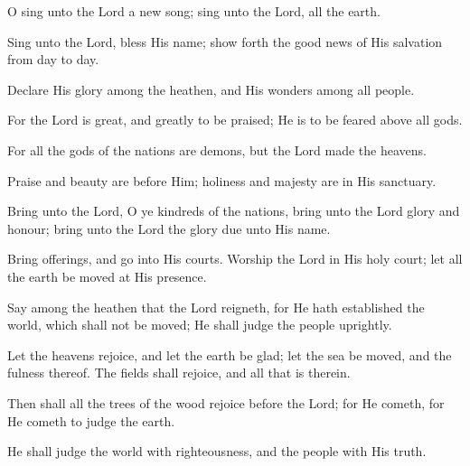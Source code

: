 O sing unto the Lord a new song; sing unto the Lord, all the earth.

Sing unto the Lord, bless His name; show forth the good news of His salvation from day to day.

Declare His glory among the heathen, and His wonders among all people.

For the Lord is great, and greatly to be praised; He is to be feared above all gods.

For all the gods of the nations are demons, but the Lord made the heavens.

Praise and beauty are before Him; holiness and majesty are in His sanctuary.

Bring unto the Lord, O ye kindreds of the nations, bring unto the Lord glory and honour; bring unto the Lord the glory due unto His name.

Bring offerings, and go into His courts. Worship the Lord in His holy court; let all the earth be moved at His presence.

Say among the heathen that the Lord reigneth, for He hath established the world, which shall not be moved; He shall judge the people uprightly.

Let the heavens rejoice, and let the earth be glad; let the sea be moved, and the fulness thereof. The fields shall rejoice, and all that is therein.

Then shall all the trees of the wood rejoice before the Lord; for He cometh, for He cometh to judge the earth.

He shall judge the world with righteousness, and the people with His truth.
